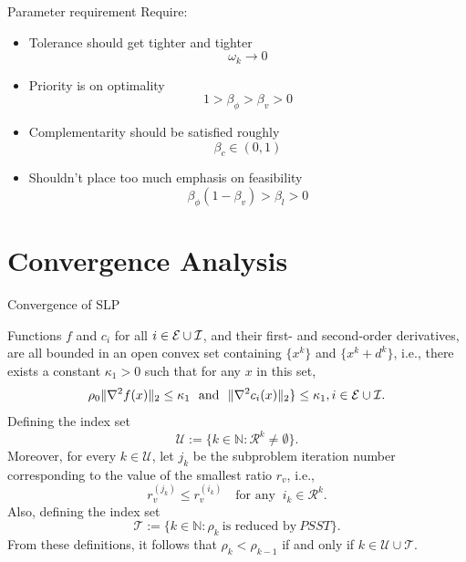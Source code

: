 \documentclass[8pt]{beamer}
\begin{document}
	\begin{frame}{Parameter requirement}
		Require: 
		\vfill
		\begin{itemize}
			\item Tolerance should get tighter and tighter
				\[ \boxed{\omega_k \to 0 }\]
			\item Priority is on optimality 
				\[ \boxed{1> \beta_\phi  > \beta_v > 0}\]
			\item Complementarity should be satisfied roughly 
				\[\boxed{ \beta_c \in (0,1)}\]
			\item Shouldn't place too much emphasis on feasibility 
				\[\boxed{ \beta_\phi(1-\beta_v)   > \beta_l>0 }\]
		\end{itemize}
	\end{frame}

\section[Convergence Analysis]{Convergence Analysis}

	\begin{frame}{Convergence of SLP}
		\begin{assumption}\label{ass.algorithm}
			Functions $f$ and $c_i$ for all $i \in {\cal E}\cup{\cal I}$, and their first- and second-order  derivatives, are all  bounded in an open convex set containing $\{x^k\}$ and $\{x^k+d^k\}$, i.e., there exists a constant  $\kappa_1>0$  such that  for any $x$ in this set, 
			\[  \rho_0\|\nabla^2f(x)\|_2 \le \kappa_1\ \text{  and  }\  \|\nabla^2c_i(x)\|_2 \} \le \kappa_1, i\in{\cal E}\cup{\cal I}.\] 
			Defining the index set 
			\[ \mathcal{U} := \{k \in \mathbb{N} : \mathcal{R}^k\ne\emptyset \} . \]
			Moreover, for every $k\in\mathcal{U}$, let $j_k$ be the subproblem iteration number corresponding to the value of the smallest ratio $r_v$, i.e.,
			\[   r_v^{(j_k)} \le r_v^{(i_k)} \quad \text{for any }\  i_k\in\mathcal{R}^k.\]
			Also, defining the index set 
			\[  \mathcal{T} := \{ k \in\mathbb{N}: \rho_k \  \text{is reduced by}\ PSST \}. \]
			From these definitions, it follows that $\rho_k < \rho_{k-1}$ if and only if $k\in\mathcal{U}\cup\mathcal{T}$.
		\end{assumption}
		\vfill
	\end{frame}
\end{document}
